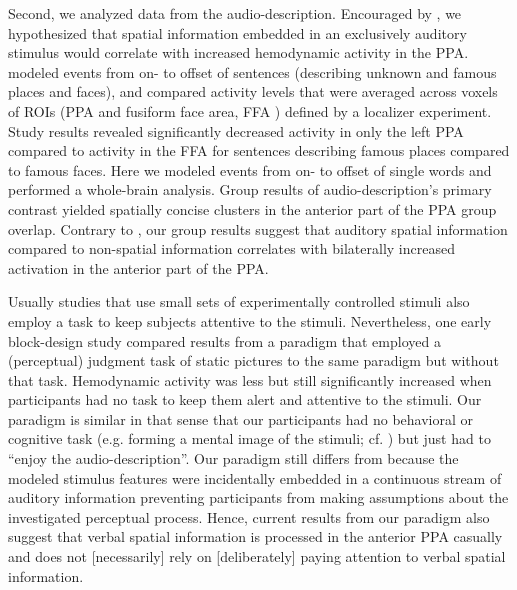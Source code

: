 \documentclass[english]{article}
\begin{document}
Second, we analyzed data from the audio-description.
Encouraged by \citep{aziz2008modulation}, we hypothesized that spatial
information embedded in an exclusively auditory stimulus would correlate with
increased hemodynamic activity in the PPA.
\citep{aziz2008modulation} modeled events from on- to offset of sentences
(describing unknown and famous places and faces), and compared activity levels
that were averaged across voxels of ROIs (PPA and fusiform face area, FFA
\citep{kanwisher1997ffa}) defined by a localizer experiment.
Study results revealed significantly decreased activity in only the left PPA
compared to activity in the FFA for sentences describing famous places compared
to famous faces.
Here we modeled events from on- to offset of single words and performed a
whole-brain analysis.
Group results of audio-description's primary contrast yielded spatially concise
clusters in the anterior part of the PPA group overlap.
Contrary to \citep{aziz2008modulation}, our group results suggest that auditory
spatial information compared to non-spatial information correlates with
bilaterally increased activation in the anterior part of the PPA.

Usually studies that use small sets of experimentally controlled stimuli also
employ a task to keep subjects attentive to the stimuli.
Nevertheless, one early block-design study \citep{epstein1998ppa} compared
results from a paradigm that employed a (perceptual) judgment task of static
pictures to the same paradigm but without that task.
Hemodynamic activity was less but still significantly increased when
participants had no task to keep them alert and attentive to the stimuli.
Our paradigm is similar in that sense that our participants had no behavioral or
cognitive task (e.g. forming a mental image of the stimuli; cf.
\citep{ocraven2000mental})  but just had to ``enjoy the audio-description''.
Our paradigm still differs from \citep{epstein1998ppa} because the modeled
stimulus features were incidentally embedded in a continuous stream of auditory
information preventing participants from making assumptions about the
investigated perceptual process.
Hence, current results from our paradigm also suggest that verbal spatial
information is processed in the anterior PPA casually and does not [necessarily]
rely on [deliberately] paying attention to verbal spatial information.
\end{document}
